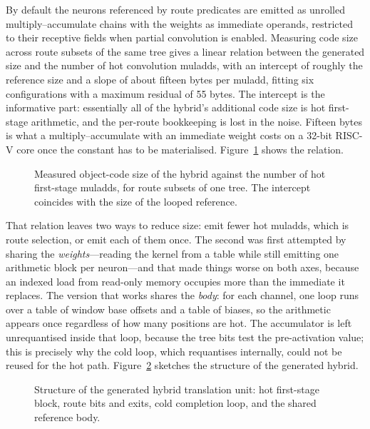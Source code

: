 By default the neurons referenced by route predicates are emitted as unrolled multiply--accumulate chains with the weights as immediate operands, restricted to their receptive fields when partial convolution is enabled.
Measuring code size across route subsets of the same tree gives a linear relation between the generated size and the number of hot convolution muladds, with an intercept of roughly the reference size and a slope of about fifteen bytes per muladd, fitting six configurations with a maximum residual of 55 bytes.
The intercept is the informative part: essentially all of the hybrid's additional code size is hot first-stage arithmetic, and the per-route bookkeeping is lost in the noise.
Fifteen bytes is what a multiply--accumulate with an immediate weight costs on a 32-bit \mbox{RISC-V} core once the constant has to be materialised.
Figure~\ref{fig:impl-flash-model} shows the relation.

\begin{figure}[H]
	\centering
	\caption{Measured object-code size of the hybrid against the number of hot first-stage muladds, for route subsets of one tree.
		The intercept coincides with the size of the looped reference.}
	\label{fig:impl-flash-model}
\end{figure}

That relation leaves two ways to reduce size: emit fewer hot muladds, which is route selection, or emit each of them once.
The second was first attempted by sharing the \emph{weights}---reading the kernel from a table while still emitting one arithmetic block per neuron---and that made things worse on both axes, because an indexed load from read-only memory occupies more than the immediate it replaces.
The version that works shares the \emph{body}: for each channel, one loop runs over a table of window base offsets and a table of biases, so the arithmetic appears once regardless of how many positions are hot.
The accumulator is left unrequantised inside that loop, because the tree bits test the pre-activation value; this is precisely why the cold loop, which requantises internally, could not be reused for the hot path.
Figure~\ref{fig:impl-generated-c} sketches the structure of the generated hybrid.

\begin{figure}[H]
	\centering
	\caption{Structure of the generated hybrid translation unit: hot first-stage block, route bits and exits, cold completion loop, and the shared reference body.}
	\label{fig:impl-generated-c}
\end{figure}

